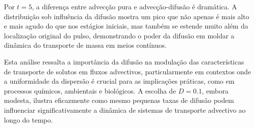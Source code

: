 Por \( t = 5 \), a diferença entre advecção pura e advecção-difusão é dramática. A distribuição sob influência da difusão mostra um pico que não apenas é mais alto e mais agudo do que nos estágios iniciais, mas também se estende muito além da localização original do pulso, demonstrando o poder da difusão em moldar a dinâmica do transporte de massa em meios contínuos.

Esta análise ressalta a importância da difusão na modulação das características de transporte de solutos em fluxos advectivos, particularmente em contextos onde a uniformidade da dispersão é crucial para as implicações práticas, como em processos químicos, ambientais e biológicos. A escolha de \( D = 0.1 \), embora modesta, ilustra eficazmente como mesmo pequenas taxas de difusão podem influenciar significativamente a dinâmica de sistemas de transporte advectivo ao longo do tempo.
